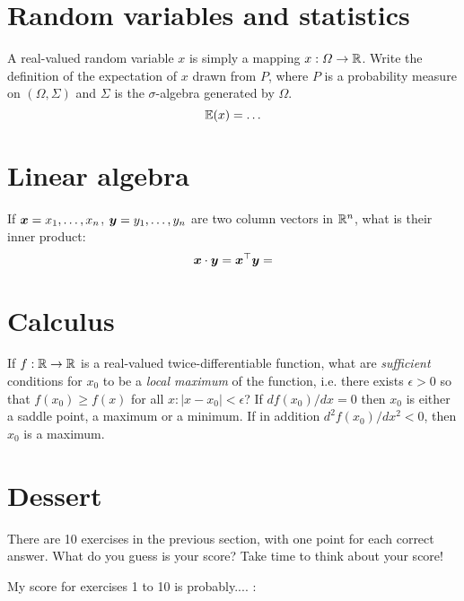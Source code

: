 \documentclass[a4paper]{article}
\begin{document}
\section{Random variables and statistics}


\begin{exercise}
  A real-valued random variable $x$ is simply a mapping $x : \Omega \to {\mathbb{R}}$.
  Write the definition of the expectation of $x$ drawn from $P$, where $P$ is a probability measure on $(\Omega, \Sigma)$ and $\Sigma$ is the $\sigma$-algebra generated by $\Omega$.
  \[
  \E(x) = 
  \ifdefined \solution
  \sum_{\omega \in \Omega} x(\omega) P(\omega) 
  \else
  \ldots
  \fi
  \]
\end{exercise}



\section{Linear algebra}

\begin{exercise}
  If $\bx = x_1, \ldots, x_n$, $\by = y_1, \ldots, y_n$ are two column vectors in ${\mathbb{R}}^n$, what is their inner product:
  \[
  \bx \cdot \by = \bx^\top \by = 
  \ifdefined \solution
  \sum_{i=1}^n x_i y_i
  \fi
  \]
\end{exercise}


\section{Calculus}

\begin{exercise}
  If $f : {\mathbb{R}} \to {\mathbb{R}}$ is a real-valued twice-differentiable function, what are \emph{sufficient} conditions for $x_0$ to be a \emph{local maximum} of the function, i.e. there exists $\epsilon > 0$ so that $f(x_0) \geq f(x)$ for all $x : |x - x_0| < \epsilon$?
\ifdefined\solution
If $d f(x_0) /dx  = 0$ then
$x_0$ is either a saddle point, a maximum or a minimum. If in addition $d^2 f(x_0) /dx^2 < 0$, then $x_0$ is a maximum.
\fi
\end{exercise}

\section{Dessert}
\begin{exercise}
  There are 10 exercises in the previous section, with one point for each correct answer. What do you guess is your score? Take time to think about your score!

  My score for exercises 1 to 10 is probably.... : 
\end{exercise}
\end{document}
